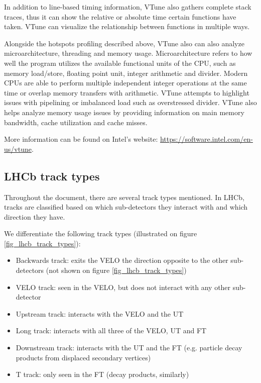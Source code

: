 \documentclass[12pt]{article}
\begin{document}
In addition to line-based timing information, VTune also gathers complete stack traces, thus it can show the relative or absolute time certain functions have taken. VTune can visualize the relationship between functions in multiple ways.
\vspace{1pc}

Alongside the hotspots profiling described above, VTune also can also analyze microarchitecture, threading and memory usage. Microarchitecture refers to how well the program utilizes the available functional units of the CPU, such as memory load/store, floating point unit, integer arithmetic and divider. Modern CPUs are able to perform multiple independent integer operations at the same time or overlap memory transfers with arithmetic. VTune attempts to highlight issues with pipelining or imbalanced load such as overstressed divider. VTune also helps analyze memory usage issues by providing information on main memory bandwidth, cache utilization and cache misses.
\vspace{1pc}

More information can be found on Intel's website: \url{https://software.intel.com/en-us/vtune}.

\subsection{LHCb track types}

Throughout the document, there are several track types mentioned. In LHCb, tracks are classified based on which sub-detectors they interact with and which direction they have.
\vspace{1pc}

\noindent We differentiate the following track types (illustrated on figure \ref{fig_lhcb_track_types}):
\begin{itemize}
	\item Backwards track: exits the VELO the direction opposite to the other sub-detectors (not shown on figure \ref{fig_lhcb_track_types})
	\item VELO track: seen in the VELO, but does not interact with any other sub-detector
	\item Upstream track: interacts with the VELO and the UT
	\item Long track: interacts with all three of the VELO, UT and FT
	\item Downstream track: interacts with the UT and the FT (e.g. particle decay products from displaced secondary vertices)
	\item T track: only seen in the FT (decay products, similarly)
\end{itemize}
\end{document}
